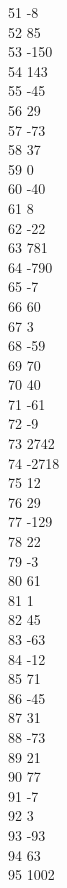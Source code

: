 { 51	-8 \\
 52	85 \\
 53	-150 \\
 54	143 \\
 55	-45 \\
 56	29 \\
 57	-73 \\
 58	37 \\
 59	0 \\
 60	-40 \\
 61	8 \\
 62	-22 \\
 63	781 \\
 64	-790 \\
 65	-7 \\
 66	60 \\
 67	3 \\
 68	-59 \\
 69	70 \\
 70	40 \\
 71	-61 \\
 72	-9 \\
 73	2742 \\
 74	-2718 \\
 75	12 \\
 76	29 \\
 77	-129 \\
 78	22 \\
 79	-3 \\
 80	61 \\
 81	1 \\
 82	45 \\
 83	-63 \\
 84	-12 \\
 85	71 \\
 86	-45 \\
 87	31 \\
 88	-73 \\
 89	21 \\
 90	77 \\
 91	-7 \\
 92	3 \\
 93	-93 \\
 94	63 \\
 95	1002 \\
}
